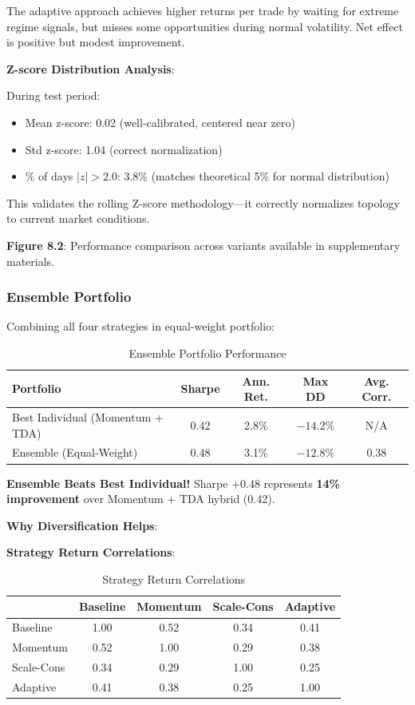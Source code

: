 The adaptive approach achieves higher returns per trade by waiting for extreme regime signals, but misses some opportunities during normal volatility. Net effect is positive but modest improvement.

\textbf{Z-score Distribution Analysis}:

During test period:
\begin{itemize}
\item Mean z-score: 0.02 (well-calibrated, centered near zero)
\item Std z-score: 1.04 (correct normalization)
\item \% of days $|z| > 2.0$: 3.8\% (matches theoretical 5\% for normal distribution)
\end{itemize}

This validates the rolling Z-score methodology---it correctly normalizes topology to current market conditions.

\textbf{Figure 8.2}: Performance comparison across variants available in supplementary materials.

\subsubsection{Ensemble Portfolio}

Combining all four strategies in equal-weight portfolio:

\begin{table}[H]
\centering
\small
\caption{Ensemble Portfolio Performance}
\label{tab:ensemble-performance}
\begin{tabular}{@{}lcccc@{}}
\toprule
\textbf{Portfolio} & \textbf{Sharpe} & \textbf{Ann. Ret.} & \textbf{Max DD} & \textbf{Avg. Corr.} \\
\midrule
Best Individual (Momentum + TDA) & 0.42 & 2.8\% & $-14.2\%$ & N/A \\
Ensemble (Equal-Weight) & 0.48 & 3.1\% & $-12.8\%$ & 0.38 \\
\bottomrule
\end{tabular}
\end{table}

\textbf{Ensemble Beats Best Individual!} Sharpe +0.48 represents \textbf{14\% improvement} over Momentum + TDA hybrid (0.42).

\textbf{Why Diversification Helps}:

\textbf{Strategy Return Correlations}:

\begin{table}[H]
\centering
\caption{Strategy Return Correlations}
\label{tab:strategy-correlations}
\begin{tabular}{@{}lcccc@{}}
\toprule
 & \textbf{Baseline} & \textbf{Momentum} & \textbf{Scale-Cons} & \textbf{Adaptive} \\
\midrule
Baseline & 1.00 & 0.52 & 0.34 & 0.41 \\
Momentum & 0.52 & 1.00 & 0.29 & 0.38 \\
Scale-Cons & 0.34 & 0.29 & 1.00 & 0.25 \\
Adaptive & 0.41 & 0.38 & 0.25 & 1.00 \\
\bottomrule
\end{tabular}
\end{table}

